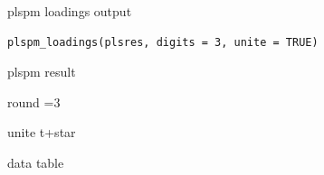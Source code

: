 \documentclass[a4paper]{book}
\begin{document}
%
\begin{Description}
plspm loadings output
\end{Description}
%
\begin{Usage}
\begin{verbatim}
plspm_loadings(plsres, digits = 3, unite = TRUE)
\end{verbatim}
\end{Usage}
%
\begin{Arguments}
\begin{ldescription}
\item[\code{plsres}] plspm result

\item[\code{digits}] round =3

\item[\code{unite}] unite t+star
\end{ldescription}
\end{Arguments}
%
\begin{Value}
data table
\end{Value}
%
\begin{Examples}
\end{Examples}
\end{document}
